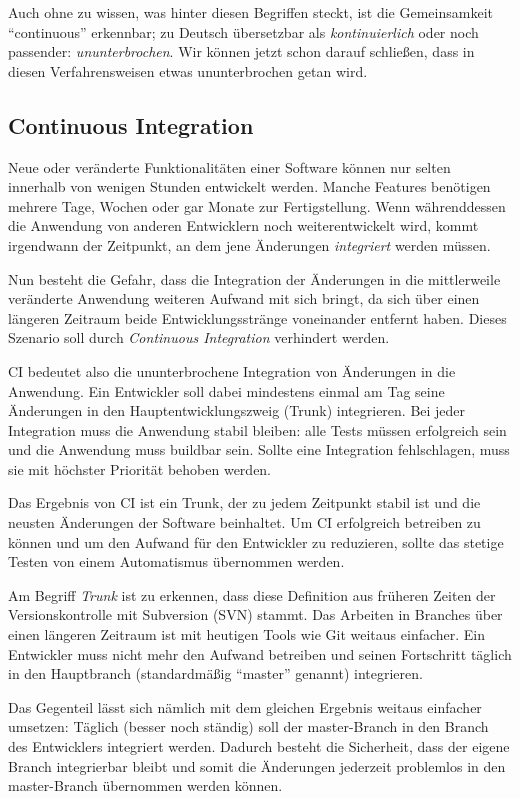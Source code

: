Auch ohne zu wissen, was hinter diesen Begriffen steckt, ist die Gemeinsamkeit ``continuous'' erkennbar; zu Deutsch übersetzbar als \emph{kontinuierlich} oder noch passender: \emph{ununterbrochen}. Wir können jetzt schon darauf schließen, dass in diesen Verfahrensweisen etwas ununterbrochen getan wird.

\subsection{Continuous Integration}

Neue oder veränderte Funktionalitäten einer Software können nur selten innerhalb von wenigen Stunden entwickelt werden. Manche Features benötigen mehrere Tage, Wochen oder gar Monate zur Fertigstellung. Wenn während\-dessen die Anwendung von anderen Entwicklern noch weiterentwickelt wird, kommt irgendwann der Zeitpunkt, an dem jene Änderungen \emph{integriert} werden müssen.

Nun besteht die Gefahr, dass die Integration der Änderungen in die mittlerweile veränderte Anwendung weiteren Aufwand mit sich bringt, da sich über einen längeren Zeitraum beide Entwicklungsstränge voneinander entfernt haben. Dieses Szenario soll durch \emph{Continuous Integration} verhindert werden.

\ac{CI} bedeutet also die ununterbrochene Integration von Än\-der\-ung\-en in die Anwendung. Ein Entwickler soll dabei mindestens einmal am Tag seine Änderungen in den Hauptentwicklungszweig (Trunk) integrieren. Bei jeder Integration muss die Anwendung stabil bleiben: alle Tests müssen erfolgreich sein und die Anwendung muss buildbar sein. Sollte eine Integration fehlschlagen, muss sie mit höchster Priorität behoben werden. \citep[25ff]{Duvall2007}

Das Ergebnis von \ac{CI} ist ein Trunk, der zu jedem Zeitpunkt stabil ist und die neusten Änderungen der Software beinhaltet. Um \ac{CI} erfolgreich betreiben zu können und um den Aufwand für den Entwickler zu reduzieren, sollte das stetige Testen von einem Automatismus übernommen werden.

Am Begriff \emph{Trunk} ist zu erkennen, dass diese Definition aus früheren Zeiten der Versionskontrolle mit Subversion (SVN) stammt. Das Arbeiten in Branches über einen längeren Zeitraum ist mit heutigen Tools wie Git weitaus einfacher. Ein Entwickler muss nicht mehr den Aufwand betreiben und seinen Fortschritt täglich in den Hauptbranch (standardmäßig ``master'' genannt) integrieren.

Das Gegenteil lässt sich nämlich mit dem gleichen Ergebnis weitaus einfacher umsetzen: Täglich (besser noch ständig) soll der master-Branch in den Branch des Entwicklers integriert werden. Dadurch besteht die Sicherheit, dass der eigene Branch integrierbar bleibt und somit die Änderungen jederzeit problemlos in den master-Branch übernommen werden können.

